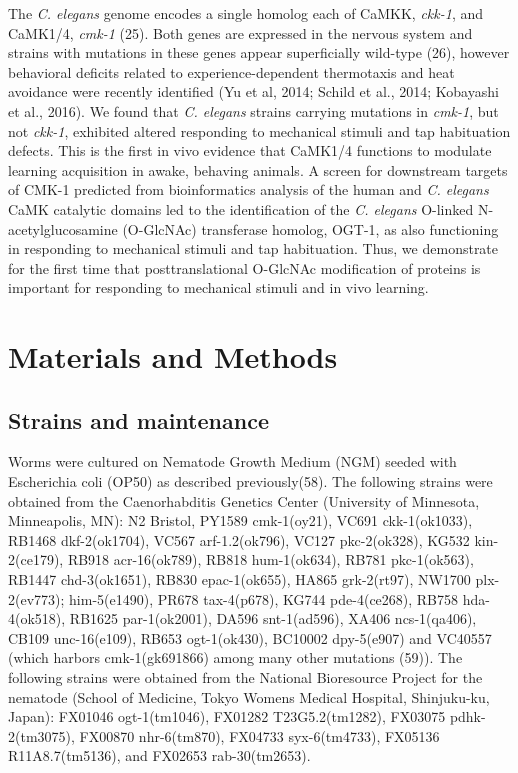\documentclass[9pt,twocolumn,twoside]{gsajnl}
\begin{document}
	The \textit{C. elegans} genome encodes a single homolog each of CaMKK, \textit{ckk-1}, and CaMK1/4, \textit{cmk-1} (25). Both genes are expressed in the nervous system and strains with mutations in these genes appear superficially wild-type (26), however behavioral deficits related to experience-dependent thermotaxis and heat avoidance were recently identified (Yu et al, 2014; Schild et al., 2014; Kobayashi et al., 2016). We found that \textit{C. elegans} strains carrying mutations in \textit{cmk-1}, but not \textit{ckk-1}, exhibited altered responding to mechanical stimuli and tap habituation defects. This is the first in vivo evidence that CaMK1/4 functions to modulate learning acquisition in awake, behaving animals. A screen for downstream targets of CMK-1 predicted from bioinformatics analysis of the human and \textit{C. elegans} CaMK catalytic domains led to the identification of the \textit{C. elegans} O-linked N-acetylglucosamine (O-GlcNAc) transferase homolog, OGT-1, as also functioning in responding to mechanical stimuli and tap habituation. Thus, we demonstrate for the first time that posttranslational O-GlcNAc modification of proteins is important for responding to mechanical stimuli and in vivo learning.

\section{Materials and Methods}
\label{sec:materials:methods}

\subsection{Strains and maintenance} 

Worms were cultured on Nematode Growth Medium (NGM) seeded with Escherichia coli (OP50) as described previously(58). The following strains were obtained from the Caenorhabditis Genetics Center (University of Minnesota, Minneapolis, MN): N2 Bristol, PY1589 cmk-1(oy21), VC691 ckk-1(ok1033), RB1468 dkf-2(ok1704), VC567 arf-1.2(ok796), VC127 pkc-2(ok328), KG532 kin-2(ce179), RB918 acr-16(ok789), RB818 hum-1(ok634), RB781 pkc-1(ok563), RB1447 chd-3(ok1651), RB830 epac-1(ok655), HA865 grk-2(rt97), NW1700 plx-2(ev773); him-5(e1490), PR678 tax-4(p678), KG744 pde-4(ce268), RB758 hda-4(ok518), RB1625 par-1(ok2001), DA596 snt-1(ad596), XA406 ncs-1(qa406), CB109 unc-16(e109), RB653 ogt-1(ok430), BC10002 dpy-5(e907) and VC40557 (which harbors cmk-1(gk691866) among many other mutations (59)). The following strains were obtained from the National Bioresource Project for the nematode (School of Medicine, Tokyo Womens Medical Hospital, Shinjuku-ku, Japan): FX01046 ogt-1(tm1046), FX01282 T23G5.2(tm1282), FX03075 pdhk-2(tm3075), FX00870 nhr-6(tm870), FX04733 syx-6(tm4733), FX05136 R11A8.7(tm5136), and FX02653 rab-30(tm2653).
\end{document}
